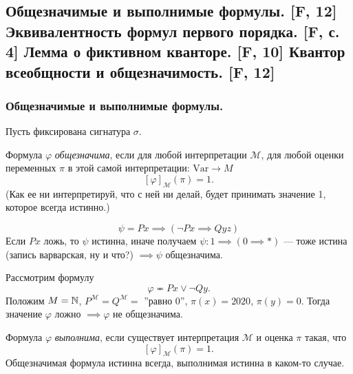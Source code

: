 \documentclass[a4paper, fleqn]{article}
\begin{document}
    \subsection{Общезначимые и выполнимые формулы. [F, 12] Эквивалентность формул первого порядка. [F, с. 4] Лемма о фиктивном кванторе. [F, 10] Квантор всеобщности и общезначимость. [F, 12]}
    
    \subsubsection{Общезначимые и выполнимые формулы.}

    Пусть фиксирована сигнатура $\sigma$. 
    \begin{definition}
        Формула $\varphi$ {\it общезначима}, если для любой интерпретации $\mathcal{M}$, для 
        любой оценки переменных $\pi$ в этой самой интерпретации: $\text{Var} \to M$ 
        \[
            [\varphi]_{\mathcal{M}}(\pi) = 1.
        \]
        (Как ее ни интерпретируй, что с ней ни делай, будет принимать значение 1, 
        которое всегда истинно.)
    \end{definition}

    \begin{example}
        \[
            \psi = Px \implies (\neg Px \implies Qyz)
        \]
        Если $Px$ ложь, то $\psi$ истинна, иначе получаем $\psi \colon 1 \implies 
        (0 \implies *)$ --- тоже истина (запись варварская, ну и что?) $\implies 
        \psi $ общезначима. 
    \end{example}
    \begin{example}
        Рассмотрим формулу
        \[
            \varphi \eqcirc Px \lor \neg Qy.
        \]
        Положим $M = \mathbb{N}$, $P^{\mathcal{M}} = Q^{\mathcal{M}} =$ 
        ''равно 0'', $\pi(x) = 2020$, $\pi(y) = 0$.
        Тогда значение $\varphi$ ложно $ \implies \varphi $ не общезначима.
    \end{example}

    \begin{definition}
        Формула $\varphi$ {\it выполнима}, если существует интерпретация $\mathcal{M}$ 
        и оценка $\pi$ такая, что
        \[
            [\varphi]_{\mathcal{M}}(\pi) = 1.
        \]
        Общезначимая формула истинна всегда, выполнимая истинна в каком-то случае.
    \end{definition}
        
\end{document}
